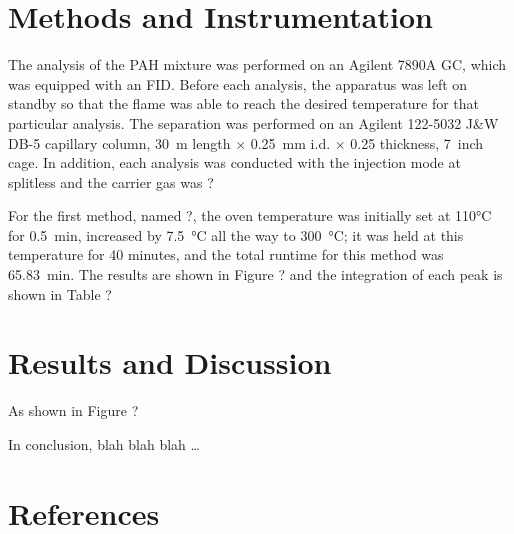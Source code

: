 \documentclass[a4paper, 12pt]{article}
\begin{document}

\section{Methods and Instrumentation}
The analysis of the PAH mixture was performed on an Agilent 7890A GC, which was equipped with an FID. Before each analysis, the apparatus was left on standby so that the flame was able to reach the desired temperature for that particular analysis. The separation was performed on an Agilent 122-5032 J\&W DB-5 capillary column, \SI{30}{m} length $\times$ \SI{0.25}{mm} i.d. $\times$ \SI{0.25}{\mu} thickness, \SI{7}{inch} cage. In addition, each analysis was conducted with the injection mode at splitless and the carrier gas was ?

For the first method, named ?, the oven temperature was initially set at \ang{110}\si{C} for \SI{0.5}{min}, increased by \SI{7.5}{\degreeCelsius} all the way to \SI{300}{\degreeCelsius}; it was held at this temperature for 40 minutes, and the total runtime for this method was \SI{65.83}{\minute}. The results are shown in Figure ? and the integration of each peak is shown in Table ?


\section{Results and Discussion}
As shown in Figure ?

In conclusion, blah blah blah \ldots


\section{References}
\printbibliography

\end{document}
